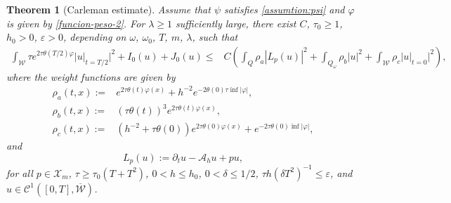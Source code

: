 \documentclass{amsart}
\numberwithin{equation}{section}
\newtheorem{theorem}{Theorem}[section]
\begin{document}
\begin{theorem}[Carleman estimate]\label{theo:Carleman:02}
Assume that $\psi$ satisfies \eqref{assumtion:psi} and $\varphi$ is given by \eqref{funcion-peso-2}. For $\lambda\geq 1$ sufficiently large, there exist $C$, $\tau_{0}\geq 1$, $h_{0}>0$, $\varepsilon >0$, depending on $\omega$, $\omega_{0}$, $T$, $m$, $\lambda$, such that    \begin{align}\label{ine:carleman:semi-discreteNew:02}
		\int_{\mathcal{W}}\tau e^{2\tau\theta(T/2)\varphi}\Big|u|_{t=T/2}\Big|^2+I_{0}(u)+J_{0}(u) 
		\leq&  C\left(\int_Q\rho_a|L_p(u)|^2+\int_{Q_\omega}\rho_b|u|^2 +\int_{\mathcal{W}}\rho_c\Big|u|_{t=0}\Big|^2\right),
	\end{align}
where the weight functions are given by 
\begin{align*}           \rho_a(t,x):= &e^{2\tau\theta(t)\varphi(x)}+h^{-2}e^{-2\theta(0)\tau\inf|\varphi|},\\
\rho_b(t,x):= &(\tau\theta(t))^3e^{2\tau\theta(t)\varphi(x)},\\ 
\rho_c(t,x):= &(h^{-2}+\tau\theta(0))e^{2\tau\theta(0)\varphi(x)}+e^{-2\tau\theta(0)\inf|\varphi|},
        \end{align*}
and $$L_p(u):= \partial_tu-\mathcal{A}_h u+pu,$$
for all $p\in \mathcal{X}_{m}$, $\tau\geq \tau_{0}(T+T^{2})$, $0<h\leq h_{0}$, $0<\delta \leq 1/2$, $\tau h(\delta T^{2})^{-1}\leq \varepsilon$, and $u\in \mathcal{C}^{1}([0,T],\overline{\mathcal{W}})$.
\end{theorem}
\end{document}
